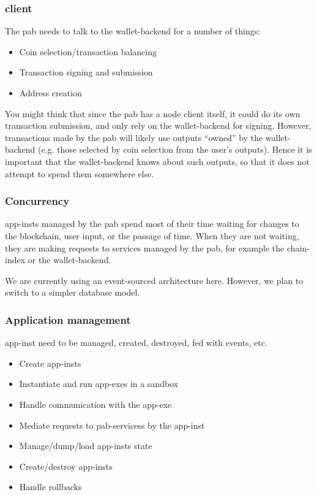 \subsubsection{ client}

The \gls{pab} needs to talk to the \gls{wallet-backend} for a number of things:
\begin{itemize}
\item Coin selection/transaction balancing
\item Transaction signing and submission
\item Address creation
\end{itemize}

You might think that since the \gls{pab} has a node client itself, it could do its own transaction submission, and only rely on the \gls{wallet-backend} for signing.
However, transactions made by the \gls{pab} will likely use outputs ``owned'' by the \gls{wallet-backend} (e.g. those selected by coin selection from the user's outputs).
Hence it is important that the \gls{wallet-backend} knows about such outputs, so that it does not attempt to spend them somewhere else.

\subsubsection{Concurrency}

\glspl{app-inst} managed by the \gls{pab} spend most of their time waiting for changes to the blockchain, user input, or the passage of time.
When they are not waiting, they are making requests to services managed by the \gls{pab}, for example the \gls{chain-index} or the \gls{wallet-backend}.


We are currently using an event-sourced architecture here.
However, we plan to switch to a simpler database model.

\subsubsection{Application management}

\Gls{app-inst} need to be managed, created, destroyed, fed with events, etc.

\begin{itemize}
\item Create \glspl{app-inst}
\item Instantiate and run \glspl{app-exe} in a sandbox
\item Handle communication with the \gls{app-exe}
\item Mediate requests to \glspl{pab-services} by the \gls{app-inst}
\item Manage/dump/load \glspl{app-inst} state
\item Create/destroy \glspl{app-inst}
\item Handle rollbacks
\end{itemize}

